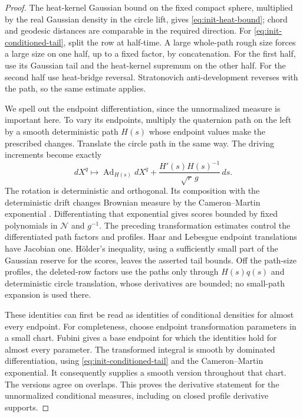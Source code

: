 \begin{proof}
The heat-kernel Gaussian bound on the fixed compact sphere, multiplied
by the real Gaussian density in the circle lift, gives
\eqref{eq:init-heat-bound}; chord and geodesic distances are comparable
in the required direction.  For \eqref{eq:init-conditioned-tail}, split
the row at half-time.  A large whole-path rough size forces a large size
on one half, up to a fixed factor, by concatenation.  For the first half,
use its Gaussian tail and the heat-kernel supremum on the other half.
For the second half use heat-bridge reversal.  Stratonovich
anti-development reverses with the path, so the same estimate applies.

We spell out the endpoint differentiation, since the unnormalized
measure is important here.  To vary its endpoints, multiply the
quaternion path on the left by a smooth deterministic path $H(s)$ whose
endpoint values make the prescribed changes.  Translate the circle
path in the same way.  The driving increments become exactly
\[
 dX^q\longmapsto \operatorname{Ad}_{H(s)}dX^q
       +\frac{H'(s)H(s)^{-1}}{\sqrt r\,g}\,ds.
\]
The rotation is deterministic and orthogonal.  Its composition with
the deterministic drift changes Brownian measure by the
Cameron--Martin exponential
\cite[Theorem~2]{CameronMartin1944}.  Differentiating that exponential gives
scores bounded by fixed polynomials in $\mathcal N$ and $g^{-1}$.
The preceding transformation estimates control the differentiated path
factors and profiles.  Haar and Lebesgue endpoint translations have
Jacobian one.  H\"older's inequality, using a sufficiently small part of
the Gaussian reserve for the scores, leaves the asserted tail bounds.
Off the path-size profiles, the deleted-row factors use the paths only
through $H(s)q(s)$ and deterministic circle translation, whose derivatives
are bounded; no small-path expansion is used there.

These identities can first be read as identities of conditional
densities for almost every endpoint.  For completeness, choose endpoint
transformation parameters in a small chart.  Fubini gives a base endpoint
for which the identities hold for almost every parameter.  The
transformed integral is smooth by dominated differentiation, using
\eqref{eq:init-conditioned-tail} and the Cameron--Martin exponential.
It consequently supplies a smooth version throughout that chart.
The versions agree on overlaps.  This proves the derivative statement
for the unnormalized conditional measures, including on closed profile
derivative supports.
\end{proof}

